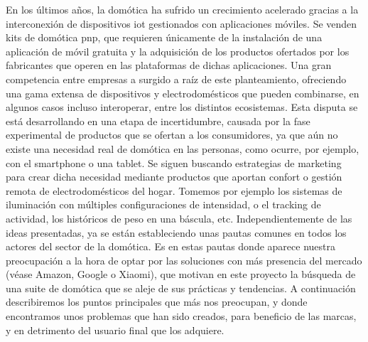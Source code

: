 En los últimos años, la domótica ha sufrido un crecimiento acelerado gracias a la interconexión de dispositivos \gls{iot} gestionados con aplicaciones móviles. Se venden kits de domótica \Gls{pnp}, que requieren únicamente de la instalación de una aplicación de móvil gratuita y la adquisición de los productos ofertados por los fabricantes que operen en las plataformas de dichas aplicaciones. Una gran competencia entre empresas a surgido a raíz de este planteamiento, ofreciendo una gama extensa de dispositivos y electrodomésticos que pueden combinarse, en algunos casos incluso interoperar, entre los distintos ecosistemas. Esta disputa se está desarrollando en una etapa de incertidumbre, causada por la fase experimental de productos que se ofertan a los consumidores, ya que aún no existe una necesidad real de domótica en las personas, como ocurre, por ejemplo, con el \gls{smartphone} o una \gls{tablet}. Se siguen buscando estrategias de marketing para crear dicha necesidad mediante productos que aportan confort o gestión remota de electrodomésticos del hogar. Tomemos por ejemplo los sistemas de iluminación con múltiples configuraciones de intensidad, o el tracking de actividad, los históricos de peso en una báscula, etc. Independientemente de las ideas presentadas, ya se están estableciendo unas pautas comunes en todos los actores del sector de la domótica. Es en estas pautas donde aparece nuestra preocupación a la hora de optar por las soluciones con más presencia del mercado (véase Amazon, Google o Xiaomi), que motivan en este proyecto la búsqueda de una suite de domótica que se aleje de sus prácticas y tendencias. A continuación describiremos los puntos principales que más nos preocupan, y donde encontramos unos problemas que han sido creados, para beneficio de las marcas, y en detrimento del usuario final que los adquiere.

\vspace{1cm}

